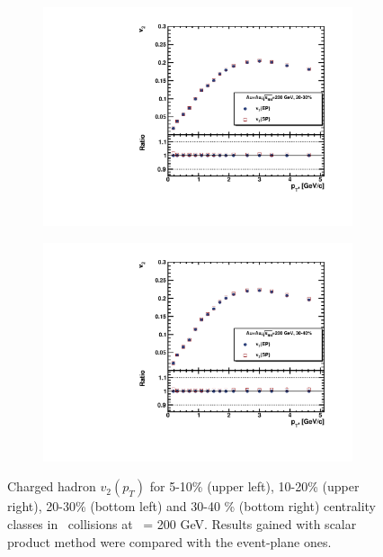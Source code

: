 \begin{figure}[ht]
    \begin{subfigure}{.49\textwidth}
        \centering
        \includegraphics[width=1.\linewidth]{Figures/v2_CH_SP_pt_cent3.pdf}
    \end{subfigure}
    \begin{subfigure}{.49\textwidth}
        \centering
        \includegraphics[width=1.\linewidth]{Figures/v2_CH_SP_pt_cent4.pdf}
    \end{subfigure}
    \label{fig:v2_SP_CH}
    \caption{Charged hadron $v_2(p_T)$ for 5-10\% (upper left), 10-20\% (upper right), 20-30\% (bottom left) and 30-40 \% (bottom right) centrality classes in \AuAu\ collisions at \sNN\ = 200 GeV. Results gained with scalar product method were compared with the event-plane ones.}
\end{figure}

